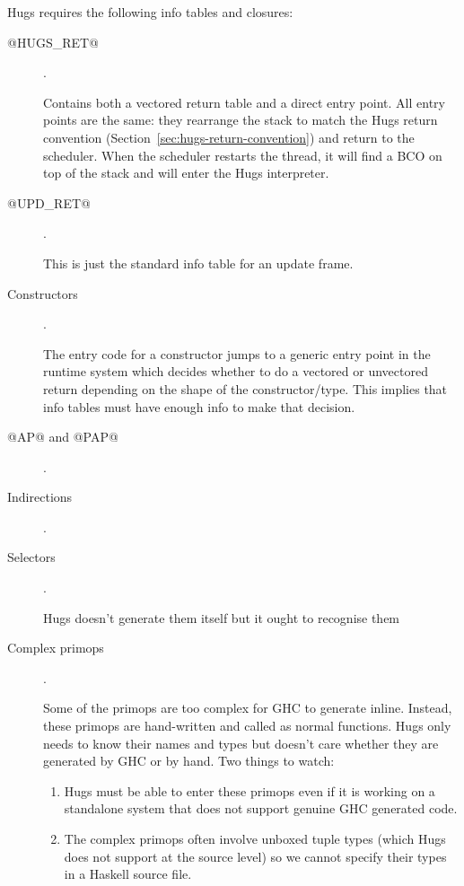 \documentclass[11pt]{article}
\newcommand{\secref}[1]{Section~\ref{sec:#1}}
\begin{document}
Hugs requires the following info tables and closures:
\begin{description}
\item [@HUGS\_RET@].

Contains both a vectored return table and a direct entry point.  All
entry points are the same: they rearrange the stack to match the Hugs
return convention (\secref{hugs-return-convention}) and return to the
scheduler.  When the scheduler restarts the thread, it will find a BCO
on top of the stack and will enter the Hugs interpreter.

\item [@UPD\_RET@].

This is just the standard info table for an update frame.

\item [Constructors].

The entry code for a constructor jumps to a generic entry point in the
runtime system which decides whether to do a vectored or unvectored
return depending on the shape of the constructor/type.  This implies that
info tables must have enough info to make that decision.

\item [@AP@ and @PAP@].

\item [Indirections].

\item [Selectors].

Hugs doesn't generate them itself but it ought to recognise them

\item [Complex primops].

Some of the primops are too complex for GHC to generate inline.
Instead, these primops are hand-written and called as normal functions.
Hugs only needs to know their names and types but doesn't care whether
they are generated by GHC or by hand.  Two things to watch:

\begin{enumerate}
\item
Hugs must be able to enter these primops even if it is working on a
standalone system that does not support genuine GHC generated code.

\item The complex primops often involve unboxed tuple types (which
Hugs does not support at the source level) so we cannot specify their
types in a Haskell source file.

\end{enumerate}

\end{description}
\end{document}

